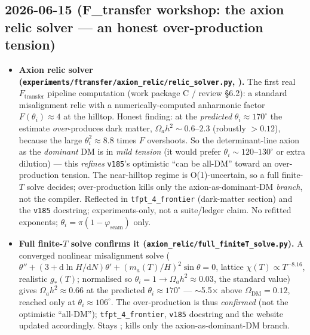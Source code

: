 \documentclass[11pt]{article}
\providecommand{\vref}[1]{\texttt{#1}}
\begin{document}
\subsection*{2026-06-15 (F\_transfer workshop: the axion relic solver --- an honest over-production tension)}
\begin{itemize}
\item \textbf{Axion relic solver (\texttt{experiments/ftransfer/axion\_relic/relic\_solver.py}, \mC).} The
  first real $F_{\mathrm{transfer}}$ pipeline computation (work package C / review \S6.2): a standard
  misalignment relic with a numerically-computed anharmonic factor $F(\theta_i)\approx4$ at the hilltop.
  Honest finding: at the \emph{predicted} $\theta_i\approx170^\circ$ the estimate \emph{over}-produces dark
  matter, $\Omega_a h^2\sim0.6$--$2.3$ (robustly $>0.12$), because the large $\theta_i^2\approx8.8$ times $F$
  overshoots. So the determinant-line axion as the \emph{dominant} DM is in \emph{mild tension} (it would
  prefer $\theta_i\sim120$--$130^\circ$ or extra dilution) --- this \emph{refines} \vref{v185}'s optimistic
  ``can be all-DM'' toward an over-production tension. The near-hilltop regime is O(1)-uncertain, so a full
  finite-$T$ solve decides; over-production kills only the axion-as-dominant-DM \emph{branch}, not the
  compiler. Reflected in \texttt{tfpt\_4\_frontier} (dark-matter section) and the \vref{v185} docstring;
  experiments-only, not a suite/ledger claim. No refitted exponents; $\theta_i=\pi(1-\varphi_{\mathrm{seam}})$
  only.
\item \textbf{Full finite-$T$ solve confirms it (\texttt{axion\_relic/full\_finiteT\_solve.py}).} A converged
  nonlinear misalignment solve ($\theta''+(3+\mathrm{d}\ln H/\mathrm{d}N)\theta'+(m_a(T)/H)^2\sin\theta=0$,
  lattice $\chi(T)\propto T^{-8.16}$, realistic $g_*(T)$; normalised so $\theta_i{=}1\to\Omega_a h^2\approx0.03$,
  the standard value) gives $\Omega_a h^2\approx0.66$ at the predicted $\theta_i\approx170^\circ$ ---
  $\sim$5.5$\times$ above $\Omega_{\mathrm{DM}}=0.12$, reached only at $\theta_i\approx106^\circ$. The
  over-production is thus \emph{confirmed} (not the optimistic ``all-DM''); \texttt{tfpt\_4\_frontier},
  \vref{v185} docstring and the website updated accordingly. Stays \mC; kills only the
  axion-as-dominant-DM branch.
\end{itemize}
\end{document}
